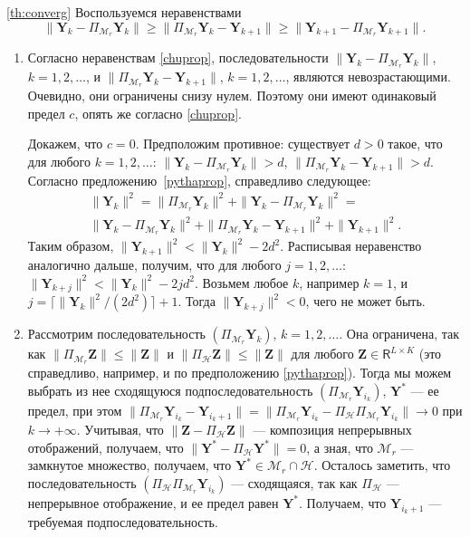 \documentclass[12pt,a4paper,fleqn,leqno]{article}
\newcommand{\bfY}{\mathbf{Y}}
\newcommand{\bfZ}{\mathbf{Z}}
\newcommand{\calH}{\mathcal{H}}
\newcommand{\calM}{\mathcal{M}}
\newcommand{\sfR}{\mathsf{R}}
\begin{document}
\begin{proof2}{\ref{th:converg}}
Воспользуемся неравенствами \cite{Chu.etal2003}
\begin{equation}
\label{chuprop}
\|\bfY_k - \Pi_{\calM_r} \bfY_k\| \ge \|\Pi_{\calM_r} \bfY_k - \bfY_{k + 1}\| \ge \|\bfY_{k+1} - \Pi_{\calM_r} \bfY_{k + 1}\|.
\end{equation}

\begin{enumerate}
\item Согласно неравенствам \eqref{chuprop}, последовательности $\|\bfY_k - \Pi_{\calM_r} \bfY_k\|$, $k = 1, 2, \ldots$, и $\|\Pi_{\calM_r} \bfY_k - \bfY_{k + 1}\|$, $k = 1, 2, \ldots$, являются невозрастающими. Очевидно, они ограничены снизу нулем. Поэтому они имеют одинаковый предел $c$, опять же согласно \eqref{chuprop}.

Докажем, что $c = 0$. Предположим противное: существует $d > 0$ такое, что для любого $k = 1, 2, \ldots$: $\|\bfY_k - \Pi_{\calM_r} \bfY_k\| > d$, $\|\Pi_{\calM_r} \bfY_k - \bfY_{k + 1}\| > d$. Согласно предложению~\ref{pythaprop}, справедливо следующее:
\begin{gather*}
\|\bfY_k\|^2 = \|\Pi_{\calM_r} \bfY_k\|^2 + \|\bfY_k - \Pi_{\calM_r} \bfY_k\|^2 =\\ \|\bfY_k - \Pi_{\calM_r} \bfY_k\|^2 + \|\Pi_{\calM_r} \bfY_k - \bfY_{k + 1}\|^2 + \|\bfY_{k + 1}\|^2.
\end{gather*}
Таким образом, $\|\bfY_{k+1}\|^2 < \|\bfY_k\|^2 - 2d^2$. Расписывая неравенство аналогично дальше, получим, что для любого $j = 1, 2, \ldots$: $\|\bfY_{k+j}\|^2 < \|\bfY_k\|^2 - 2 j d^2$. Возьмем любое $k$, например $k = 1$, и $j = \lceil \|\bfY_k\|^2 / (2d^2) \rceil + 1$. Тогда $\|\bfY_{k+j}\|^2 < 0$, чего не может быть.
\item Рассмотрим последовательность $(\Pi_{\calM_r} \bfY_k)$, $k = 1, 2, \ldots$. Она ограничена, так как $\|\Pi_{\calM_r} \bfZ\| \le \|\bfZ\|$ и $\|\Pi_{\calH} \bfZ\| \le \|\bfZ\|$ для любого $\bfZ \in \sfR^{L \times K}$ (это справедливо, например, и по предположению \ref{pythaprop}). Тогда мы можем выбрать из нее сходящуюся подпоследовательность $(\Pi_{\calM_r} \bfY_{i_k})$, $\bfY^*$ --- ее предел, при этом $\|\Pi_{\calM_r} \bfY_{i_k} - \bfY_{i_k + 1}\| = \|\Pi_{\calM_r} \bfY_{i_k} - \Pi_\calH \Pi_{\calM_r} \bfY_{i_k}\| \to 0$ при $k \to + \infty$. Учитывая, что $\|\bfZ - \Pi_\calH \bfZ\|$ --- композиция непрерывных отображений, получаем, что $\|\bfY^* - \Pi_\calH \bfY^*\| = 0$, а зная, что $\calM_r$ --- замкнутое множество, получаем, что $\bfY^* \in \calM_r \cap \calH$. Осталось заметить, что последовательность $(\Pi_\calH \Pi_{\calM_r} \bfY_{i_k})$ --- сходящаяся, так как $\Pi_\calH$ --- непрерывное отображение, и ее предел равен $\bfY^*$. Получаем, что $\bfY_{i_k + 1}$ --- требуемая подпоследовательность.
\end{enumerate}
\end{proof2}
\end{document}
